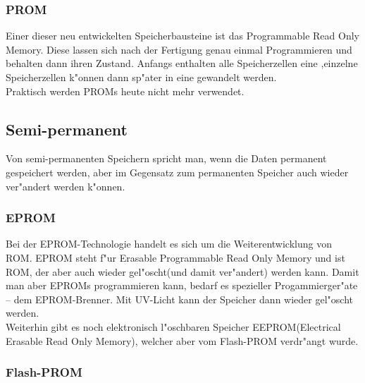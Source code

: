				\subsubsection{PROM}
				\label{ch:Technisch:sec:Elektronische Speicherung:sub:Fl"uchtig:subsub:PROM}
				
				Einer dieser neu entwickelten Speicherbausteine ist das \glqq Programmable Read Only Memory\grqq{}. Diese lassen sich nach der Fertigung genau einmal Programmieren und behalten dann ihren Zustand. Anfangs enthalten alle Speicherzellen eine \grqq{},einzelne Speicherzellen k"onnen dann sp"ater in eine  \grqq{} gewandelt werden.
				\\
				Praktisch werden PROMs heute nicht mehr verwendet. 
            
        \subsection{Semi-permanent}
        \label{ch:Technisch:sec:Elektronische Speicherung:sub:Semi-permanent}
        
            Von semi-permanenten Speichern spricht man, wenn die Daten permanent gespeichert werden, aber im Gegensatz zum permanenten Speicher auch wieder ver"andert werden k"onnen. 
			
				\subsubsection{EPROM}
				\label{ch:Technisch:sec:Elektronische Speicherung:sub:Fl"uchtig:subsub:EPROM}
					
				Bei der EPROM-Technologie handelt es sich um die Weiterentwicklung von ROM. EPROM steht f"ur \glqq Erasable Programmable Read Only Memory\grqq{} und ist ROM, der aber auch wieder gel"oscht(und damit ver"andert) werden kann. Damit man aber EPROMs programmieren kann, bedarf es spezieller Progammierger"ate – dem \glqq EPROM-Brenner\grqq{}. Mit UV-Licht kann der Speicher dann wieder gel"oscht werden.
				\\
				Weiterhin gibt es noch elektronisch l"oschbaren Speicher EEPROM(\glqq Electrical Erasable Read Only Memory\grqq{}), welcher aber vom Flash-PROM verdr"angt wurde.
				
				\subsubsection{Flash-PROM}
				\label{ch:Technisch:sec:Elektronische Speicherung:sub:Fl"uchtig:subsub:Flash-PROM}
				
